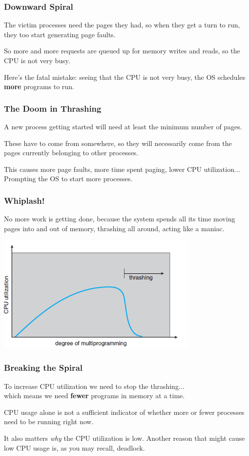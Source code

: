 \begin{frame}
\frametitle{Downward Spiral}

The victim processes need the pages they had, so when they get a turn to run, they too start generating page faults. 

So more and more requests are queued up for memory writes and reads, so the CPU is not very busy. 

Here's the fatal mistake: seeing that the CPU is not very busy, the OS schedules \textbf{more} programs to run.  

\end{frame}

\begin{frame}
\frametitle{The Doom in Thrashing}

A new process getting started will need at least the minimum number of pages. 

These have to come from somewhere, so they will necessarily come from the pages currently belonging to other processes. 

This causes more page faults, more time spent paging, lower CPU utilization...\\
\quad Prompting the OS to start more processes. 
\end{frame}

\begin{frame}
\frametitle{Whiplash!}

No more work is getting done, because the system spends all its time moving pages into and out of memory, thrashing all around, acting like a maniac.

\begin{center}
\includegraphics[width=0.75\textwidth]{images/thrashing.png}
\end{center}

\end{frame}

\begin{frame}
\frametitle{Breaking the Spiral}

To increase CPU utilization we need to stop the thrashing...\\
\quad which means we need \textbf{fewer} programs in memory at a time. 

CPU usage alone is not a sufficient indicator of whether more or fewer processes need to be running right now. 

It also matters \textit{why} the CPU utilization is low. Another reason that might cause low CPU usage is, as you may recall, deadlock. 


\end{frame}

